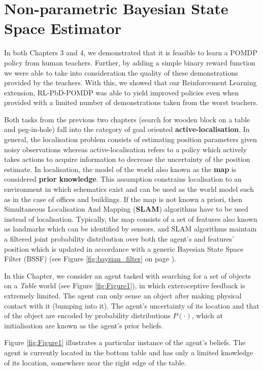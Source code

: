 \chapter{Non-parametric Bayesian State Space Estimator}

In both Chapters 3 and 4, we demonstrated that it is feasible to learn a POMDP policy from human teachers. Further,
by adding a simple binary reward function we were able to take into consideration the quality of these demonstrations 
provided by the teachers. With this, we showed that our Reinforcement Learning extension, RL-PbD-POMDP was able to 
yield improved policies even when provided with a limited number of demonstrations taken from the worst teachers.

Both tasks from the previous two chapters (search for wooden block on a table and peg-in-hole) fall into 
the category of goal oriented \textbf{active-localisation}. In general, the localisation problem consists of estimating 
position parameters given noisy observations whereas active-localisation refers to a policy which actively takes actions to 
acquire information to decrease the uncertainty of the position estimate. In localisation, the model 
of the world also known as the \textbf{map} is considered \textbf{prior knowledge}. This assumption constrains localisation 
to an environment in which schematics exist and can be used 
as the world model such as in the case of offices and buildings. If the map is not known a priori, then Simultaneous Localisation And Mapping (\textbf{SLAM}) algorithms have to be used instead
of localisation. Typically, the map consists of a set of features also known as landmarks which can be identified by sensors, 
and SLAM algorithms maintain a filtered joint probability distribution over both the agent's and features' position which is updated in accordance with a generic 
Bayesian State Space Filter (BSSF) (see Figure \ref{fig:baysian_filter} on page \pageref{fig:baysian_filter}).

In this Chapter, we consider an agent tasked with searching for a set of objects on a \textit{Table} world (see Figure \ref{fig:Figure1}), 
in which exteroceptive feedback is extremely limited. The agent can only sense an object after making physical 
contact with it (bumping into it). The agent's uncertainty of its location and that of the object are encoded by probability distributions $P(\cdot)$, which 
at initialisation are known as the agent's prior beliefs.

Figure \ref{fig:Figure1} illustrates a particular instance of the agent's beliefs. The agent is currently located in the 
bottom  table and has only a limited knowledge of its location, somewhere near the right edge of the table. 

